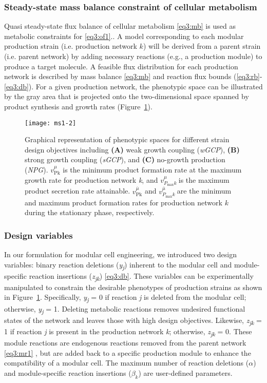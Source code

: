 \subsubsection{Steady-state mass balance constraint of cellular metabolism}
Quasi steady-state flux balance of cellular metabolism \eqref{eq3:mb} is used as metabolic constraints for \eqref{eq3:of1}.\citep{price2003}. A model corresponding to each modular
production strain (i.e. production network $k$) will be derived from a
parent strain (i.e. parent network) by adding necessary reactions (e.g.,
a production module) to produce a target molecule. A feasible flux
distribution for each production network is described by mass balance
\eqref{eq3:mb} and reaction flux bounds (\ref{eq3:rb}-\ref{eq3:db}). For a given
production network, the phenotypic space can be illustrated by the gray
area that is projected onto the two-dimensional space spanned by product
synthesis and growth rates (Figure~\ref{fig:ms1-fig2}).

\begin{figure}[h]
  \centering
  \texttt{[image: ms1-2]}
    \caption[Graphical representation of phenotypic spaces for different strain design objectives]{
Graphical representation of phenotypic spaces for
different strain design objectives including \textbf{(A)} weak growth
coupling (\emph{wGCP}), \textbf{(B)} strong growth coupling
(\emph{sGCP}), and \textbf{(C)} no-growth production (\emph{NPG}).
\(v_{\text{Pk}}^{\mu}\) is the minimum product formation rate at the
maximum growth rate for production network \emph{k}, and
\(v_{P_{\max}k}^{\mu}\ \)is the maximum product secretion rate
attainable. \(v_{\text{Pk}}^{\overline{\mu}}\) and
\(v_{P_{\max}k}^{\overline{\mu}}\ \)are the minimum and maximum product
formation rates for production network \(k\) during the stationary
phase, respectively.
    }
    \label{fig:ms1-fig2}
\end{figure}

\subsubsection{Design variables} In our formulation for modular cell
engineering, we introduced two design variables: binary reaction
deletions (\emph{y\textsubscript{j}}) inherent to the modular cell and
module-specific reaction insertions (\emph{z\textsubscript{jk}}) \eqref{eq3:db}.
These variables can be experimentally manipulated to constrain the
desirable phenotypes of production strains as shown in Figure~\ref{fig:ms1-fig2}.
Specifically, \emph{y\textsubscript{j}} = 0 if reaction \emph{j} is
deleted from the modular cell; otherwise, \emph{y\textsubscript{j}} = 1.
Deleting metabolic reactions removes undesired functional states of the
network and leaves those with high design objectives. Likewise,
\emph{z\textsubscript{jk}} = 1 if reaction \emph{j} is present in the
production network \emph{k}; otherwise, \emph{z\textsubscript{jk}} = 0.
These module reactions are endogenous reactions removed from the parent
network \eqref{eq3:mr1} , but are added back to a specific production module to
enhance the compatibility of a modular cell. The maximum number of
reaction deletions ($\alpha$) and module-specific reaction insertions
($\beta_k$) are user-defined parameters.

